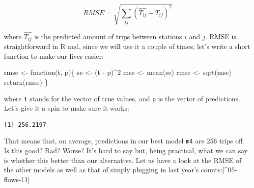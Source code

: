 \documentclass[
  letterpaper,
  DIV=11,
  numbers=noendperiod,
  oneside]{scrreprt}
\newenvironment{Shaded}{\begin{snugshade}}{\end{snugshade}}
\newcommand{\ControlFlowTok}[1]{\textcolor[rgb]{0.00,0.23,0.31}{#1}}
\newcommand{\DecValTok}[1]{\textcolor[rgb]{0.68,0.00,0.00}{#1}}
\newcommand{\FunctionTok}[1]{\textcolor[rgb]{0.28,0.35,0.67}{#1}}
\newcommand{\NormalTok}[1]{\textcolor[rgb]{0.00,0.23,0.31}{#1}}
\newcommand{\OtherTok}[1]{\textcolor[rgb]{0.00,0.23,0.31}{#1}}
\newcommand{\SpecialCharTok}[1]{\textcolor[rgb]{0.37,0.37,0.37}{#1}}
\begin{document}
\[
RMSE = \sqrt{ \sum_{ij} (\hat{T_{ij}} - T_{ij})^2}
\]

where \(\hat{T_{ij}}\) is the predicted amount of trips between stations
\(i\) and \(j\). RMSE is straightforward in R and, since we will use it
a couple of times, let's write a short function to make our lives
easier:

\begin{Shaded}
\begin{Highlighting}[]
\NormalTok{rmse }\OtherTok{\textless{}{-}} \ControlFlowTok{function}\NormalTok{(t, p)\{}
\NormalTok{  se }\OtherTok{\textless{}{-}}\NormalTok{ (t }\SpecialCharTok{{-}}\NormalTok{ p)}\SpecialCharTok{\^{}}\DecValTok{2}
\NormalTok{  mse }\OtherTok{\textless{}{-}} \FunctionTok{mean}\NormalTok{(se)}
\NormalTok{  rmse }\OtherTok{\textless{}{-}} \FunctionTok{sqrt}\NormalTok{(mse)}
  \FunctionTok{return}\NormalTok{(rmse)}
\NormalTok{\}}
\end{Highlighting}
\end{Shaded}

where \texttt{t} stands for the vector of true values, and \texttt{p} is
the vector of predictions. Let's give it a spin to make sure it works:

\begin{Shaded}
\end{Shaded}

\begin{verbatim}
[1] 256.2197
\end{verbatim}

That means that, on average, predictions in our best model \texttt{m4}
are 256 trips off. Is this good? Bad? Worse? It's hard to say but, being
practical, what we can say is whether this better than our alternative.
Let us have a look at the RMSE of the other models as well as that of
simply plugging in last year's counts:{[}\^{}05-flows-11{]}

\end{document}
